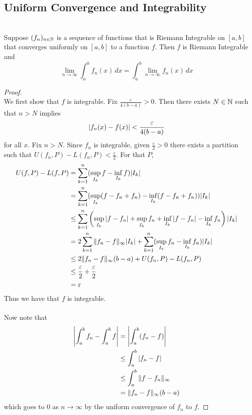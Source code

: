 \documentclass[a4paper]{article}
\begin{document}
\subsection{Uniform Convergence and Integrability}
\begin{thm}{}{}\\ Suppose $(f_n)_{n\in\mathbb{N}}$ is a sequence of functions that is Riemann Integrable on $[a,b]$ that converges uniformly on $[a,b]$ to a function $f$. Then $f$ is Riemann Integrable and $$\lim_{n\to\infty}\int_a^bf_n(x)\,dx=\int_a^b\lim_{n\to\infty}f_n(x)\,dx$$ 
\begin{proof}\\ We first show that $f$ is integrable. Fix $\frac{\varepsilon}{4(b-a)}>0$. Then there exists $N\in\mathbb{N}$ such that $n>N$ implies $$\abs{f_n(x)-f(x)}<\frac{\varepsilon}{4(b-a)}$$ for all $x$. Fix $n>N$. Since $f_n$ is integrable, given $\frac{\varepsilon}{2}>0$ there exists a partition such that $U(f_n,P)-L(f_n,P)<\frac{\varepsilon}{2}$. For that $P$,
\begin{align*}
U(f,P)-L(f,P)&=\sum_{k=1}^n(\sup_{I_k}f-\inf_{I_k}f)\abs{I_k}\\
&=\sum_{k=1}^n(\sup_{I_k}(f-f_n+f_n)-\inf_{I_k}(f-f_n+f_n))\abs{I_k}\\
&\leq\sum_{k=1}^n\left(\sup_{I_k}\abs{f-f_n}+\sup_{I_k}f_n+\inf_{I_k}\abs{f-f_n}-\inf_{I_k}f_n\right)\abs{I_k}\\
&=2\sum_{k=1}^n\|f_n-f\|_\infty\abs{I_k}+\sum_{k=1}^n(\sup_{I_k}f_n-\inf_{I_k}f_n)\abs{I_k}\\
&\leq 2\|f_n-f\|_\infty(b-a)+U(f_n,P)-L(f_n,P)\\
&\leq\frac{\varepsilon}{2}+\frac{\varepsilon}{2}\\
&=\varepsilon
\end{align*}
Thus we have that $f$ is integrable. 
\\~\\
Now note that
\begin{align*}
\abs{\int_a^bf_n-\int_a^bf}&=\abs{\int_a^b(f_n-f)}\\
&\leq\int_a^b\abs{f_n-f}\\
&\leq\int_a^b\|f-f_n\|_\infty\\
&=\|f_n-f\|_\infty(b-a)
\end{align*}
which goes to $0$ as $n\to\infty$ by the uniform convergence of $f_n$ to $f$. 
\end{proof}
\end{thm}
\end{document}

